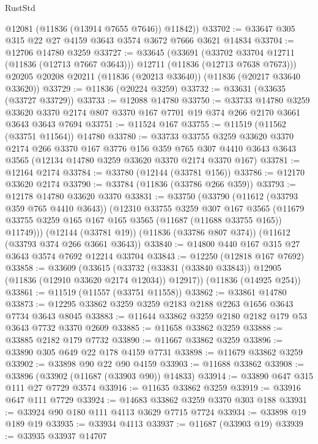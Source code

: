\begin{lexlean}{RustStd}
\begin{coremodule}
        @12081
        (@11836 (@13914 @7655 @7646))
        @11842))
@33702 := @33647 @305 @315 @22 @27 @4159 @3643 @3574 @3672 @7666 @3621 @14834
@33704 := @12706 @14780 @3259
@33727 := @33645
    (@33691
      (@33702 @33704 @12711 (@11836 (@12713 @7667 @3643)))
      @12711
      (@11836 (@12713 @7638 @7673)))
    @20205
    @20208
    @20211
    (@11836 (@20213 @33640))
    (@11836 (@20217 @33640 @33620))
@33729 := @11836 (@20224 @3259)
@33732 := @33631 (@33635 (@33727 @33729))
@33733 := @12088 @14780
@33750 := @33733
    @14780
    @3259
    @33620
    @3370
    @2174
    @807
    @3370
    @167
    @7701
    @19
    @374
    @266
    @2170
    @3661
    @3643
    @3643
    @7694
@33751 := @11524 @167
@33755 := @11519 (@11562 (@33751 @11564)) @14780
@33780 := @33733
    @33755
    @3259
    @33620
    @3370
    @2174
    @266
    @3370
    @167
    @3776
    @156
    @359
    @765
    @307
    @4410
    @3643
    @3643
    @3565
    (@12134 @14780 @3259 @33620 @3370 @2174 @3370 @167)
@33781 := @12164 @2174
@33784 := @33780 (@12144 (@33781 @156))
@33786 := @12170 @33620 @2174
@33790 := @33784 (@11836 (@33786 @266 @359))
@33793 := @12178 @14780 @33620 @3370
@33831 := @33750
    (@33790
      (@11612 (@33793 @359 @765 @4410 @3643))
      (@12310
        @33755
        @3259
        @307
        @167
        @3565
        (@11679 @33755 @3259 @165 @167 @165 @3565 (@11687 (@11688 @33755 @165)) @11749)))
    (@12144 (@33781 @19))
    (@11836 (@33786 @807 @374))
    (@11612 (@33793 @374 @266 @3661 @3643))
@33840 := @14800 @440 @167 @315 @27 @3643 @3574 @7692 @12214 @33704
@33843 := @12250 (@12818 @167 @7692)
@33858 := @33609
    (@33615 (@33732 (@33831 (@33840 @33843)) @12905 (@11836 (@12910 @33620 @2174 @12034)) @12917))
    (@11836 (@14925 @254))
@33861 := @11519 (@11557 (@33751 @11558))
@33862 := @33861 @14780
@33873 := @12295 @33862 @3259 @3259 @2183 @2188 @2263 @1656 @3643 @7734 @3643 @8045
@33883 := @11644 @33862 @3259 @2180 @2182 @179 @53 @3643 @7732 @3370 @2609
@33885 := @11658 @33862 @3259
@33888 := @33885 @2182 @179 @7732
@33890 := @11667 @33862 @3259
@33896 := @33890 @305 @649 @22 @178 @4159 @7731
@33898 := @11679 @33862 @3259
@33902 := @33898 @90 @22 @90 @4159
@33903 := @11688 @33862
@33908 := @33896 (@33902 (@11687 (@33903 @90)) @14833)
@33914 := @33890 @647 @315 @111 @27 @7729 @3574
@33916 := @11635 @33862 @3259
@33919 := @33916 @647 @111 @7729
@33924 := @14683 @33862 @3259 @3370 @303 @188
@33931 := @33924 @90 @180 @111 @4113 @3629 @7715 @7724
@33934 := @33898 @19 @189 @19
@33935 := @33934 @4113
@33937 := @11687 (@33903 @19)
@33939 := @33935 @33937 @14707

\end{coremodule}
\end{lexlean}
